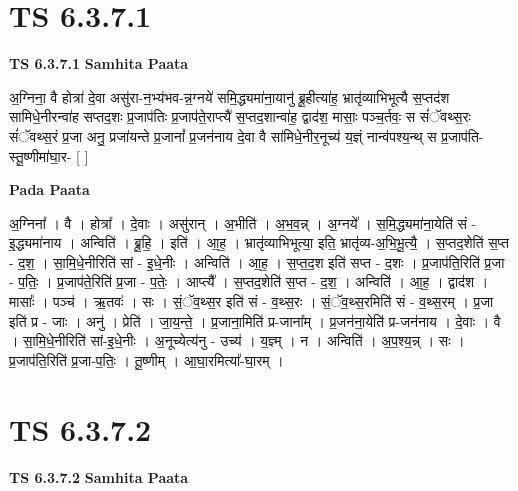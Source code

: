 \documentclass[17pt]{extarticle}
\begin{document}
\section*{ TS 6.3.7.1 }

\textbf{TS 6.3.7.1 } \newline
\textbf{Samhita Paata} \newline

अ॒ग्निना॒ वै होत्रा॑ दे॒वा असु॑रा-न॒भ्य॑भव-न्न॒ग्नये॑ समि॒द्ध्यमा॑ना॒यानु॑ ब्रू॒हीत्या॑ह॒ भ्रातृ॑व्याभिभूत्यै स॒प्तद॑श सामिधे॒नीरन्वा॑ह सप्तद॒शः प्र॒जाप॑तिः प्र॒जाप॑ते॒राप्त्यै॑ स॒प्तद॒शान्वा॑ह॒ द्वाद॑श॒ मासाः॒ पञ्च॒र्तवः॒ स सं॑ॅवथ्स॒रः सं॑ॅवथ्स॒रं प्र॒जा अनु॒ प्रजा॑यन्ते प्र॒जानां᳚ प्र॒जन॑नाय दे॒वा वै सा॑मिधे॒नीर॒नूच्य॑ य॒ज्ञ्ं नान्व॑पश्य॒न्थ् स प्र॒जाप॑ति-स्तू॒ष्णीमा॑घा॒र- [  ] \newline

\textbf{Pada Paata} \newline

अ॒ग्निना᳚ । वै । होत्रा᳚ । दे॒वाः । असु॑रान् । अ॒भीति॑ । अ॒भ॒व॒न्न् । अ॒ग्नये᳚ । स॒मि॒द्ध्यमा॑ना॒येति॑ सं - इ॒द्ध्यमा॑नाय । अन्विति॑ । ब्रू॒हि॒ । इति॑ । आ॒ह॒ । भ्रातृ॑व्याभिभूत्या॒ इति॒ भ्रातृ॑व्य-अ॒भि॒भू॒त्यै॒ । स॒प्तद॒शेति॑ स॒प्त - द॒श॒ । सा॒मि॒धे॒नीरिति॑ सां - इ॒धे॒नीः । अन्विति॑ । आ॒ह॒ । स॒प्त॒द॒श इति॑ सप्त - द॒शः । प्र॒जाप॑ति॒रिति॑ प्र॒जा - प॒तिः॒ । प्र॒जाप॑ते॒रिति॑ प्र॒जा - प॒तेः॒ । आप्त्यै᳚ । स॒प्तद॒शेति॑ स॒प्त - द॒श॒ । अन्विति॑ । आ॒ह॒ । द्वाद॑श । मासाः᳚ । पञ्च॑ । ऋ॒तवः॑ । सः । सं॒ॅव॒थ्स॒र इति॑ सं - व॒थ्स॒रः । सं॒ॅव॒थ्स॒रमिति॑ सं - व॒थ्स॒रम् । प्र॒जा इति॑ प्र - जाः । अनु॑ । प्रेति॑ । जा॒य॒न्ते॒ । प्र॒जाना॒मिति॑ प्र-जाना᳚म् । प्र॒जन॑ना॒येति॑ प्र-जन॑नाय । दे॒वाः । वै । सा॒मि॒धे॒नीरिति॑ सां-इ॒धे॒नीः । अ॒नूच्येत्य॑नु - उच्य॑ । य॒ज्ञ्म् । न । अन्विति॑ । अ॒प॒श्य॒न्न् । सः । प्र॒जाप॑ति॒रिति॑ प्र॒जा-प॒तिः॒ । तू॒ष्णीम् । आ॒घा॒रमित्या᳚-घा॒रम् ।  \newline




\section*{ TS 6.3.7.2 }

\textbf{TS 6.3.7.2 } \newline
\textbf{Samhita Paata} \newline
\end{document}
